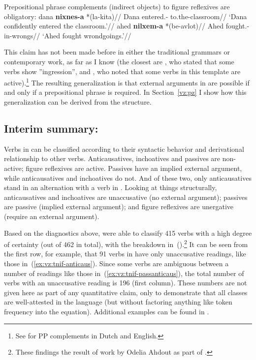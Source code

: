 \pex Prepositional phrase complements (indirect objects) to figure reflexives are obligatory:
	\a \begingl
		\gla dana \textbf{nixnes-a} *(la-kita)//
		\glb Dana entered.- to.the-classroom//
		\glft `Dana confidently entered the classroom.'//
	\endgl
	\a \begingl
		\gla ahed \textbf{nilxem-a} *(be-avlot)//
		\glb Ahed fought.- in-wrongs//
		\glft `Ahed fought wrondgoings.'//
	\endgl
\xe

This claim has not been made before in either the traditional grammars or contemporary work, as far as I know (the closest are \citealt[87]{berman78}, who stated that some verbs show ''ingression'', and \citealt{schwarzwald08}, who noted that some verbs in this template are active).\footnote{See \cite{neeleman97} for PP complements in Dutch and English.} The resulting generalization is that external arguments in {\tnif} are possible if and only if a prepositional phrase is required. In Section~\ref{vz:pz} I show how this generalization can be derived from the structure.

	\subsection{Interim summary: \tnif} \label{vz:tnif:sum}
Verbs in {\tnif} can be classified according to their syntactic behavior and derivational relationship to other verbs. Anticausatives, inchoatives and passives are non-active; figure reflexives are active. Passives have an implied external argument, while anticausatives and inchoatives do not. And of these two, only anticausatives stand in an alternation with a verb in {\tkal}. Looking at things structurally, anticausatives and inchoatives are unaccusative (no external argument); passives are passive (implied external argument); and figure reflexives are unergative (require an external argument).

Based on the diagnostics above, \cite{ahdoutkastner19nels} were able to classify 415 verbs with a high degree of certainty (out of 462 in total), with the breakdown in~(\nextx).\footnote{These findings the result of work by Odelia Ahdout as part of \citet{ahdout19phd}.} It can be seen from the first row, for example, that 91 verbs in {\tnif} have only unaccusative readings, like those in~(\ref{ex:vz:tnif-anticaus}). Since some verbs are ambiguous between a number of readings like those in~(\ref{ex:vz:tnif-passanticaus}), the total number of verbs with an unaccusative reading is 196 (first column). These numbers are not given here as part of any quantitative claim, only to demonstrate that all classes are well-attested in the language (but without factoring anything like token frequency into the equation). Additional examples can be found in \cite{ahdoutkastner19nels}.

